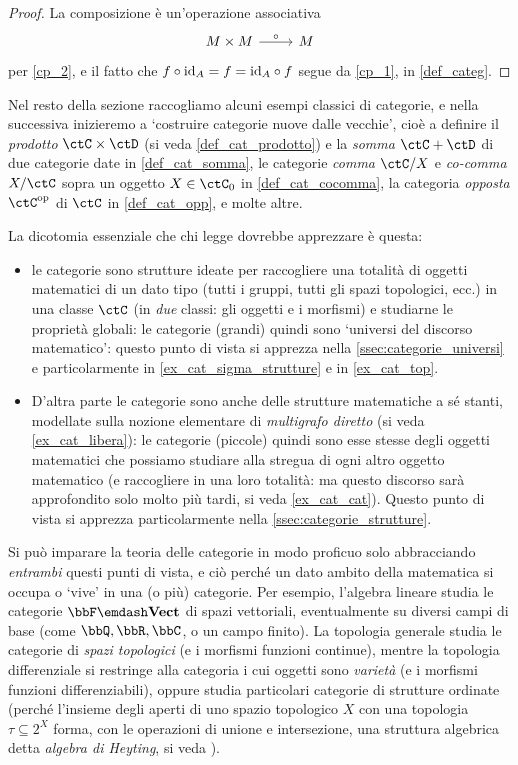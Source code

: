 \begin{proof}
	La composizione è un'operazione associativa
	\[\begin{tikzcd}
			M\times M \ar[r, "\cmp"] & M
		\end{tikzcd}\]
	per \ref{cp_2}, e il fatto che \(f\circ \mathrm{id}_A=f=\mathrm{id}_A\circ f\) segue da \ref{cp_1}, in \ref{def_categ}.
\end{proof}
Nel resto della sezione raccogliamo alcuni esempi classici di categorie, e nella successiva inizieremo a `costruire categorie nuove dalle vecchie', cioè a definire il \emph{prodotto} \(\ctC\times\ctD\) (si veda \ref{def_cat_prodotto}) e la \emph{somma} \(\ctC+\ctD\) di due categorie date in \ref{def_cat_somma}, le categorie \emph{comma} \(\ctC/X\) e \emph{co-comma} \(X/\ctC\) sopra un oggetto \(X\in\ctC_0\) in \ref{def_cat_cocomma}, la categoria \emph{opposta} \(\ctC^\op\) di \(\ctC\) in \ref{def_cat_opp}, e molte altre.

La dicotomia essenziale che chi legge dovrebbe apprezzare è questa:
\begin{itemize}
	\item le categorie sono strutture ideate per raccogliere una totalità di oggetti matematici di un dato tipo (tutti i gruppi, tutti gli spazi topologici, ecc.) in una classe \(\ctC\) (in \emph{due} classi: gli oggetti e i morfismi) e studiarne le proprietà globali: le categorie (grandi) quindi sono `universi del discorso matematico': questo punto di vista si apprezza nella \autoref{ssec:categorie_universi} e particolarmente in \ref{ex_cat_sigma_strutture} e in \ref{ex_cat_top}.
	\item D'altra parte le categorie sono anche delle strutture matematiche a sé stanti, modellate sulla nozione elementare di \emph{multigrafo diretto} (si veda \ref{ex_cat_libera}): le categorie (piccole) quindi sono esse stesse degli oggetti matematici che possiamo studiare alla stregua di ogni altro oggetto matematico (e raccogliere in una loro totalità: ma questo discorso sarà approfondito solo molto più tardi, si veda \ref{ex_cat_cat}). Questo punto di vista si apprezza particolarmente nella \autoref{ssec:categorie_strutture}.
\end{itemize}
Si può imparare la teoria delle categorie in modo proficuo solo abbracciando \emph{entrambi} questi punti di vista, e ciò perché un dato ambito della matematica si occupa o `vive' in una (o più) categorie. Per esempio, l'algebra lineare studia le categorie \(\bbF\emdash\ctVect\) di spazi vettoriali, eventualmente su diversi campi di base (come \(\bbQ,\bbR,\bbC\), o un campo finito). La topologia generale studia le categorie di \emph{spazi topologici} (e i morfismi funzioni continue), mentre la topologia differenziale si restringe alla categoria i cui oggetti sono \emph{varietà} (e i morfismi funzioni differenziabili), oppure studia particolari categorie di strutture ordinate (perché l'insieme degli aperti di uno spazio topologico \(X\) con una topologia \(\tau \subseteq 2^X\) forma, con le operazioni di unione e intersezione, una struttura algebrica detta \emph{algebra di Heyting}, si veda \cite{Esakia2019}).

